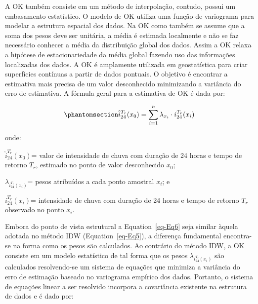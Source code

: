 \documentclass[
]{agujournal2019}
\begin{document}
A OK também consiste em um método de interpolação, contudo, possui um
embasamento estatístico. O modelo de OK utiliza uma função de variograma
para modelar a estrutura espacial dos dados. Na OK como também se assume
que a soma dos pesos deve ser unitária, a média é estimada localmente e
não se faz necessário conhecer a média da distribuição global dos dados.
Assim a OK relaxa a hipótese de estacionariedade da média global fazendo
uso das informações localizadas dos dados. A OK é amplamente utilizada
em geostatística para criar superfícies contínuas a partir de dados
pontuais. O objetivo é encontrar a estimativa mais precisa de um valor
desconhecido minimizando a variância do erro de estimativa. A fórmula
geral para a estimativa de OK é dada por:

\begin{equation}\phantomsection\label{eq-Eq6}{
\hat i_{24}^{T_r} (x_0) = \sum_{i=1}^{n} \lambda_{x_i} \cdot i_{24}^{T_r} (x_i)
}\end{equation}

onde:

\(\hat i_{24}^{T_r} (x_0)\)= valor de intensidade de chuva com duração
de 24 horas e tempo de retorno \(T_r\), estimado no ponto de valor
desconhecido \(x_0\);

\(\lambda_{i_{24}^{T_r}(x_i)}\)= pesos atribuídos a cada ponto amostral
\(x_i\); e

\(i_{24}^{T_r} (x_i)\)= intensidade de chuva com duração de 24 horas e
tempo de retorno \(T_r\) observado no ponto \(x_i\).

Embora do ponto de vista estrutural a Equation~\ref{eq-Eq6} seja similar
àquela adotada no método IDW (Equation~\ref{eq-Eq5}), a diferença
fundamental encontra-se na forma como os pesos são calculados. Ao
contrário do método IDW, a OK consiste em um modelo estatístico de tal
forma que os pesos \(\lambda_{i_{24}^{T_r}(x_i)}\) são calculados
resolvendo-se um sistema de equações que minimiza a variância do erro de
estimação baseado no variograma empírico dos dados. Portanto, o sistema
de equações linear a ser resolvido incorpora a covariância existente na
estrutura de dados e é dado por:
\end{document}
